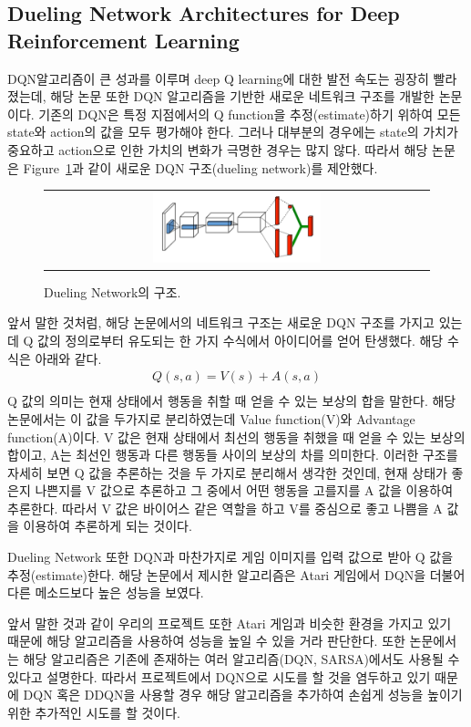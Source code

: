 \subsection{Dueling Network Architectures for Deep Reinforcement Learning}
\label{sec:survey:DuelNet}
DQN알고리즘이 큰 성과를 이루며 deep Q learning에 대한 발전 속도는 굉장히 빨라졌는데, 해당 논문 또한 DQN 알고리즘을 기반한 새로운 네트워크 구조를 개발한 논문이다. 
기존의 DQN은 특정 지점에서의 Q function을 추정(estimate)하기 위하여 모든 state와 action의 값을 모두 평가해야 한다. 
그러나 대부분의 경우에는 state의 가치가 중요하고 action으로 인한 가치의 변화가 극명한 경우는 많지 않다. 
따라서 해당 논문은 Figure~\ref{fig:dueling_network}과 같이 새로운 DQN 구조(dueling network)를 제안했다.

\begin{figure}[h]
\begin{center}
\begin{tabular}{c}
     \includegraphics[width=0.45\textwidth]{FIG/DuelingNetwork.png} \\
\end{tabular}
\caption{
	Dueling Network의 구조.
}
\label{fig:dueling_network}
\end{center}
\end{figure}

앞서 말한 것처럼, 해당 논문에서의 네트워크 구조는 새로운 DQN 구조를 가지고 있는데 Q 값의 정의로부터 유도되는 한 가지 수식에서 아이디어를 얻어 탄생했다. 
해당 수식은 아래와 같다. 
\begin{align*}
	Q(s,a) = V(s) + A(s,a) \\
\end{align*}
Q 값의 의미는 현재 상태에서 행동을 취할 때 얻을 수 있는 보상의 합을 말한다. 
해당 논문에서는 이 값을 두가지로 분리하였는데 Value function(V)와 Advantage function(A)이다. 
V 값은 현재 상태에서 최선의 행동을 취했을 때 얻을 수 있는 보상의 합이고, A는 최선인 행동과 다른 행동들 사이의 보상의 차를 의미한다. 
이러한 구조를 자세히 보면 Q 값을 추론하는 것을 두 가지로 분리해서 생각한 것인데, 현재 상태가 좋은지 나쁜지를 V 값으로 추론하고 그 중에서 어떤 행동을 고를지를 A 값을 이용하여 추론한다. 
따라서 V 값은 바이어스 같은 역할을 하고 V를 중심으로 좋고 나쁨을 A 값을 이용하여 추론하게 되는 것이다. 

Dueling Network 또한 DQN과 마찬가지로 게임 이미지를 입력 값으로 받아 Q 값을 추정(estimate)한다. 
해당 논문에서 제시한 알고리즘은 Atari 게임에서 DQN을 더불어 다른 메소드보다 높은 성능을 보였다.

앞서 말한 것과 같이 우리의 프로젝트 또한 Atari 게임과 비슷한 환경을 가지고 있기 때문에 해당 알고리즘을 사용하여 성능을 높일 수 있을 거라 판단한다. 
또한 논문에서는 해당 알고리즘은 기존에 존재하는 여러 알고리즘(DQN, SARSA)에서도 사용될 수 있다고 설명한다. 
따라서 프로젝트에서 DQN으로 시도를 할 것을 염두하고 있기 때문에 DQN 혹은 DDQN을 사용할 경우 해당 알고리즘을 추가하여 손쉽게 성능을 높이기 위한 추가적인 시도를 할 것이다.
